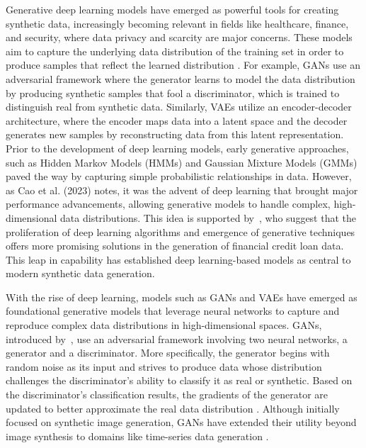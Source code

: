 \documentclass{article}
\begin{document}
Generative deep learning models have emerged as powerful tools for creating synthetic data, increasingly becoming relevant in fields like healthcare, finance, and security, where data privacy and scarcity are major concerns. These models aim to capture the underlying data distribution of the training set in order to produce samples that reflect the learned distribution \parencite{carvajal-patino_synthetic_2022}. For example, GANs use an adversarial framework where the generator learns to model the data distribution by producing synthetic samples that fool a discriminator, which is trained to distinguish real from synthetic data. Similarly, VAEs utilize an encoder-decoder architecture, where the encoder maps data into a latent space and the decoder generates new samples by reconstructing data from this latent representation. Prior to the development of deep learning models, early generative approaches, such as Hidden Markov Models (HMMs) and Gaussian Mixture Models (GMMs) paved the way by capturing simple probabilistic relationships in data. However, as Cao et al. (2023) notes, it was the advent of deep learning that brought major performance advancements, allowing generative models to handle complex, high-dimensional data distributions. This idea is supported by~\textcite{caliskan_comparative_2023}, who suggest that the proliferation of deep learning algorithms and emergence of generative techniques offers more promising solutions in the generation of financial credit loan data. This leap in capability has established deep learning-based models as central to modern synthetic data generation. 

With the rise of deep learning, models such as GANs and VAEs have emerged as foundational generative models that leverage neural networks to capture and reproduce complex data distributions in high-dimensional spaces. GANs, introduced by~\textcite{goodfellow_generative_2014}, use an adversarial framework involving two neural networks, a generator and a discriminator. More specifically, the generator begins with random noise as its input and strives to produce data whose distribution challenges the discriminator’s ability to classify it as real or synthetic. Based on the discriminator’s classification results, the gradients of the generator are updated to better approximate the real data distribution \parencite{zia_synthetic_2023}. Although initially focused on synthetic image generation, GANs have extended their utility beyond image synthesis to domains like time-series data generation \parencite{yoon_time-series_2019}. 
\end{document}
